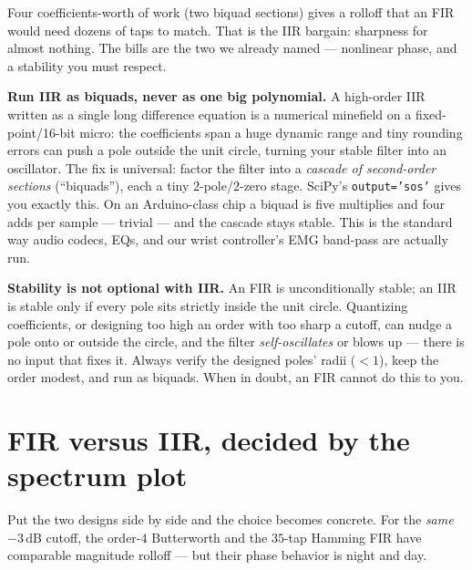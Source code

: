Four coefficients-worth of work (two biquad sections) gives a rolloff that an FIR
would need dozens of taps to match. That is the IIR bargain: sharpness for almost
nothing. The bills are the two we already named --- nonlinear phase, and a
stability you must respect.

\begin{buildbox}
\textbf{Run IIR as biquads, never as one big polynomial.} A high-order IIR written
as a single long difference equation is a numerical minefield on a
fixed-point/16-bit micro: the coefficients span a huge dynamic range and tiny
rounding errors can push a pole outside the unit circle, turning your stable filter
into an oscillator. The fix is universal: factor the filter into a \emph{cascade of
second-order sections} (``biquads''), each a tiny $2$-pole/$2$-zero stage. SciPy's
\texttt{output='sos'} gives you exactly this. On an Arduino-class chip a biquad is
five multiplies and four adds per sample --- trivial --- and the cascade stays
stable. This is the standard way audio codecs, EQs, and our wrist controller's
EMG band-pass are actually run.
\end{buildbox}

\begin{trapbox}
\textbf{Stability is not optional with IIR.} An FIR is unconditionally stable; an
IIR is stable only if every pole sits strictly inside the unit circle. Quantizing
coefficients, or designing too high an order with too sharp a cutoff, can nudge a
pole onto or outside the circle, and the filter \emph{self-oscillates} or blows up
--- there is no input that fixes it. Always verify the designed poles' radii
($<1$), keep the order modest, and run as biquads. When in doubt, an FIR cannot do
this to you.
\end{trapbox}

\section{FIR versus IIR, decided by the spectrum plot}
\label{ch16:compare}

Put the two designs side by side and the choice becomes concrete. For the
\emph{same} $-3$\,dB cutoff, the order-$4$ Butterworth and the $35$-tap Hamming FIR
have comparable magnitude rolloff --- but their phase behavior is night and day.

